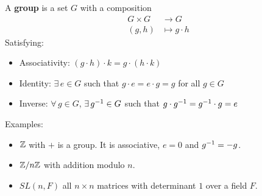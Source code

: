 \documentclass[a4paper]{article}
\begin{document}
\begin{definition}
    A \textbf{group} is a set $G$ with a composition
    \begin{align}
        G\times G &\to G \\
        (g, h) &\mapsto g\cdot h
    \end{align}
    Satisfying:
    \begin{itemize}
        \item Associativity: $(g\cdot h)\cdot k = g\cdot (h\cdot k)$
        \item Identity: $\exists\, e\in G$ such that $g\cdot e = e\cdot g = g$ for all $g\in G$
        \item Inverse: $\forall\, g\in G$, $\exists\, g^{-1}\in G$ such that $g\cdot g^{-1} = g^{-1}\cdot g = e$
    \end{itemize}
\end{definition}

Examples:
\begin{itemize}
    \item $\mathbb{Z}$ with $+$ is a group. It is associative, $e = 0$ and $g^{-1} = -g$.
    \item $\mathbb{Z}/n\mathbb{Z}$ with addition modulo $n$.
    \item $SL(n, F)$ all $n\times n$ matrices with determinant $1$ over a field $F$. 
\end{itemize}
\end{document}
